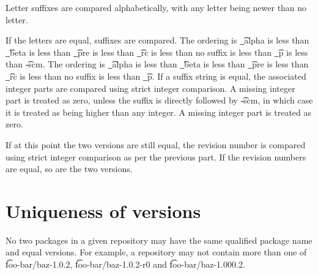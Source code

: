 Letter suffixes are compared alphabetically, with any letter being newer than no letter.

If the letters are equal, suffixes are compared.
\IFKDEBUILDELSE
{
     The ordering is \t{\_alpha} is less than \t{\_beta} is less than \t{\_pre} is less
     than \t{\_rc} is less than no suffix is less than \t{\_p} is less than \t{-scm}.
}{
     The ordering is \t{\_alpha} is less than \t{\_beta} is less than \t{\_pre} is less
     than \t{\_rc} is less than no suffix is less than \t{\_p}.
}
If a suffix string is equal, the associated integer parts
are compared using strict integer comparison.
\IFKDEBUILDELSE
{
    A missing integer part is treated as zero, unless the suffix is directly followed
    by \t{-scm}, in which case it is treated as being higher than any integer.
}{
    A missing integer part is treated as zero.
}

If at this point the two versions are still equal, the revision number is compared using strict
integer comparison as per the previous part. If the revision numbers are equal, so are the two
versions.

\section{Uniqueness of versions}

No two packages in a given repository may have the same qualified package name and equal versions.
For example, a repository may not contain more than one of \t{foo-bar/baz-1.0.2},
\t{foo-bar/baz-1.0.2-r0} and \t{foo-bar/baz-1.000.2}.


